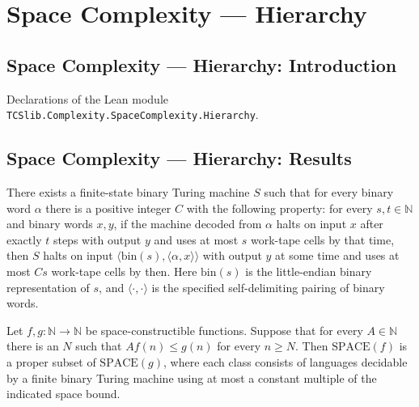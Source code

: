 \section{Space Complexity --- Hierarchy}
\subsection*{Space Complexity --- Hierarchy: Introduction}

Declarations of the Lean module \texttt{TCSlib.Complexity.SpaceComplexity.Hierarchy}.

\subsection*{Space Complexity --- Hierarchy: Results}

\begin{theorem}
\label{Complexity.space_universal}
\leanok
{}
There exists a finite-state binary Turing machine $S$ such that for every binary word
$\alpha$ there is a positive integer $C$ with the following property: for every
$s,t\in\mathbb{N}$ and binary words $x,y$, if the machine decoded from $\alpha$ halts on
input $x$ after exactly $t$ steps with output $y$ and uses at most $s$ work-tape cells
by that time, then $S$ halts on input $\langle
\mathrm{bin}(s),\langle\alpha,x\rangle\rangle$ with output $y$ at some time and uses at
most $Cs$ work-tape cells by then. Here $\mathrm{bin}(s)$ is the little-endian binary
representation of $s$, and $\langle\cdot,\cdot\rangle$ is the specified self-delimiting
pairing of binary words.
\end{theorem}

\begin{theorem}
\label{Complexity.space_hierarchy}
\leanok
{}
Let $f,g:\mathbb{N}\to\mathbb{N}$ be space-constructible functions. Suppose that for
every $A\in\mathbb{N}$ there is an $N$ such that $A f(n)\le g(n)$ for every $n\ge N$.
Then $\mathrm{SPACE}(f)$ is a proper subset of $\mathrm{SPACE}(g)$, where each class
consists of languages decidable by a finite binary Turing machine using at most a
constant multiple of the indicated space bound.
\end{theorem}

